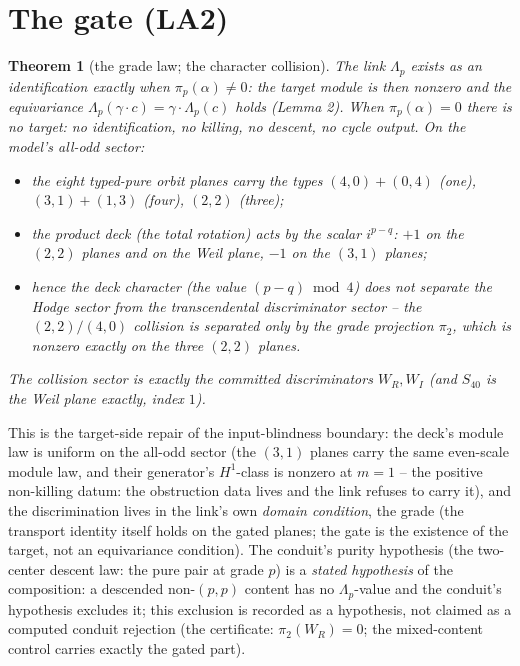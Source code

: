 \documentclass[11pt]{article}
\newtheorem{theorem}{Theorem}
\begin{document}
\section{The gate (LA2)}

\begin{theorem}[the grade law; the character collision]
The link $\Lambda_p$ exists as an identification exactly when
$\pi_p(\alpha)\ne 0$: the target module is then nonzero and the
equivariance
$\Lambda_p(\gamma\cdot c)=\gamma\cdot\Lambda_p(c)$ holds (Lemma 2).
When $\pi_p(\alpha)=0$ there is no target: no identification, no killing,
no descent, no cycle output. On the model's all-odd sector:
\begin{itemize}
\item the eight typed-pure orbit planes carry the types
$(4,0){+}(0,4)$ (one), $(3,1){+}(1,3)$ (four), $(2,2)$ (three);
\item the product deck (the total rotation) acts by the scalar
$i^{p-q}$: $+1$ on the $(2,2)$ planes \emph{and} on the Weil plane, $-1$ on
the $(3,1)$ planes;
\item hence the deck character (the value $(p-q) \bmod 4$) does not separate the
Hodge sector from the transcendental discriminator sector -- the
$(2,2)/(4,0)$ collision is separated only by the grade projection
$\pi_2$, which is nonzero exactly on the three $(2,2)$ planes.
\end{itemize}
The collision sector is exactly the committed discriminators $W_R,W_I$
(and $S_{40}$ is the Weil plane exactly, index $1$).
\end{theorem}

This is the target-side repair of the input-blindness boundary: the deck's
module law is uniform on the all-odd sector (the $(3,1)$ planes carry the
same even-scale module law, and their generator's $H^1$-class is nonzero at
$m=1$ -- the positive non-killing datum: the obstruction data lives and the
link refuses to carry it), and the discrimination lives in the link's own
\emph{domain condition}, the grade (the transport identity itself holds on
the gated planes; the gate is the existence of the target, not an
equivariance condition). The conduit's purity hypothesis (the two-center
descent law: the pure pair at grade $p$) is a \emph{stated hypothesis} of
the composition: a descended non-$(p,p)$ content has no $\Lambda_p$-value
and the conduit's hypothesis excludes it; this exclusion is recorded as a
hypothesis, not claimed as a computed conduit rejection (the certificate:
$\pi_2(W_R)=0$; the mixed-content control carries exactly the gated part).
\end{document}

